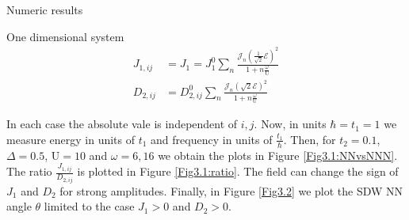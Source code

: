 \begin{section}{Numeric results}
\begin{subsection}{One dimensional system}
\begin{align}
J_{1,ij} &= J_{1} = J_{1}^0  \sum_{n} \frac{\mathcal{J}_n(\frac{1}{\sqrt{2}}\mathcal{E})^2}{1+n\frac{\omega}{\text{U}}} \\
D_{2,ij} &= D_{2,ij}^0  \sum_{n} \frac{\mathcal{J}_n(\sqrt{2}\mathcal{E})^2}{1+n\frac{\omega}{\text{U}}}
\end{align}

In each case the absolute vale is independent of $i,j$.  Now, in units $\hbar=t_1=1$ we measure energy in units of $t_1$ and frequency in units of $\frac{t_1}{\hbar}$. Then, for $t_2 = 0.1$, $\Delta = 0.5$, $\text{U} = 10$ and $\omega = 6, 16$ we obtain the plots in Figure \ref{Fig3.1:NNvsNNN}. The ratio $\frac{J_{1,ij}}{D_{2,ij}}$ is plotted in Figure \ref{Fig3.1:ratio}. The field can change the sign of $J_1$ and $D_2$ for strong amplitudes. Finally, in Figure \ref{Fig3.2} we plot the SDW NN angle $\theta$ limited to the case $J_1 > 0$ and $D_2 > 0$.


\end{subsection}
\end{section}
